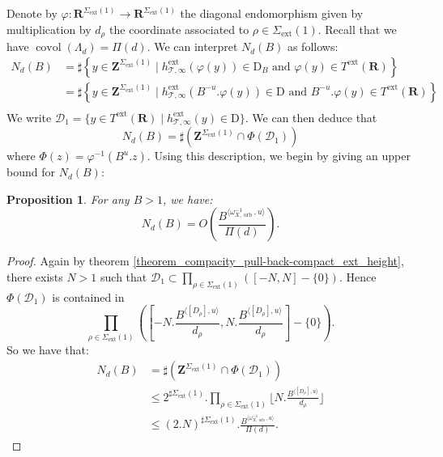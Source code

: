 \documentclass{proc-l}
\newcommand{\R}{\mathbf{R}}
\newcommand{\Z}{\mathbf{Z}}
\DeclareMathOperator{\covol}{covol}
\DeclareMathOperator{\orb}{orb}
\DeclareMathOperator{\ext}{ext}
\newcommand{\stackT}{\mathcal{T}}
\newcommand{\w}{\omega}
\newtheorem{prop}[theorem]{Proposition}
\theoremstyle{definition}
\theoremstyle{remark}
\numberwithin{equation}{section}
\begin{document}
Denote by $\varphi : \R^{\Sigma_{\ext}(1)} \rightarrow \R^{\Sigma_{\ext}(1)}$ the diagonal endomorphism given by multiplication by $d_{\rho}$ the coordinate associated to $\rho \in \Sigma_{\ext}(1)$. Recall that we have $\covol(\Lambda_d) = \Pi(d)$. We can interpret $N_d(B)$ as follows:
    \begin{align*}
        N_d(B) &= \sharp \left\{ y \in \Z^{\Sigma_{\ext}(1)} \mid h^{\ext}_{\stackT,\infty}\left( \varphi(y)  \right) \in \mathrm{D}_B \text{ and } \varphi(y) \in T^{\ext}(\R) \right\} \\
        &= \sharp \left\{ y \in \Z^{\Sigma_ {\ext}(1)} \mid h^{\ext}_{\stackT,\infty}\left( B^{-u}. \varphi(y) \right) \in \mathrm{D} \text{ and } B^{-u}. \varphi(y) \in T^{\ext}(\R) \right\} \\
    \end{align*}
We write $\mathcal{D}_1 = \{ y \in T^{\ext}(\R) \mid h^{\ext}_{\stackT,\infty}(y) \in \mathrm{D} \}$. We can then deduce that $$N_d(B) = \sharp \left( \Z^{\Sigma_{\ext}(1)} \cap \Phi(\mathcal{D}_1) \right)$$ where $\Phi(z) = \varphi^{-1} ( B^u. z ) $. Using this description, we begin by giving an upper bound for $N_d(B)$:

\begin{prop}\label{upper_bound_N_d(B)}
    For any $B > 1$, we have:
    $$N_d(B) = O\left( \frac{B^{\langle \w_{X,\orb}^{-1} , u \rangle}}{\Pi(d)} \right) .$$
\end{prop}

\begin{proof}
    Again by theorem \ref{theorem_compacity_pull-back-compact_ext_height}, there exists $N > 1$ such that $\mathcal{D}_1 \subset \prod\limits_{\rho \in \Sigma_{\ext}(1)} \left( [-N,N] - \{0\} \right)$. Hence $\Phi(\mathcal{D}_1) $ is contained in $$ \prod\limits_{\rho \in \Sigma_{\ext}(1)} \left( \left[ -N.\frac{B^{\langle [D_{\rho}] , u \rangle}}{d_{\rho}},N.\frac{B^{\langle [D_{\rho}] , u \rangle}}{d_{\rho}} \right] - \{0\} \right) .$$ So we have that:
    \begin{align*}
        N_d(B) &= \sharp(\Z^{\Sigma_{\ext}(1)} \cap \Phi(\mathcal{D}_1)) \\
        &\leqslant 2^{\sharp \Sigma_{\ext}(1)}.\prod\limits_{\rho \in \Sigma_{\ext}(1)} \lfloor N.\frac{B^{\langle [D_{\rho}] , u \rangle}}{d_{\rho}} \rfloor \\
        &\leqslant (2.N)^{\sharp \Sigma_{\ext}(1)} . \frac{B^{\langle \w_{X,\orb}^{-1},u\rangle}}{\Pi(d)} .
    \end{align*}
\end{proof}
\end{document}
